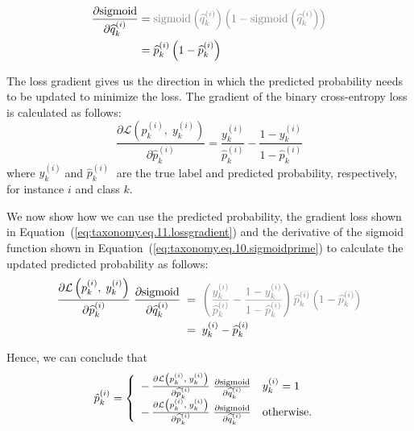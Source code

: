 \documentclass[final,1p,times,authoryear]{elsarticle}
\begin{document}
\begin{align}
    \label{eq:taxonomy.eq.10.sigmoidprime}
    \frac{\partial{\text{sigmoid}}}{\partial{\widehat{q}_k^{(i)}}}
    & = \textcolor{gray}{\text{sigmoid}\left(\widehat{q}_k^{(i)}\right)\left(1-\text{sigmoid}\left(\widehat{q}_k^{(i)}\right)\right)}
    \\
    & = \widehat{p}_k^{(i)}\left(1-\widehat{p}_k^{(i)}\right)
\end{align}

The loss gradient gives us the direction in which the predicted probability needs to be updated to minimize the loss. The gradient of the binary cross-entropy loss is calculated as follows:
\begin{equation}
    \label{eq:taxonomy.eq.11.lossgradient}
    \frac{\partial \mathcal{L} \left( \widehat{p}_k^{(i)},\;y_k^{(i)}\right)}{\partial \widehat{p}_k^{(i)} }=\frac{y_k^{(i)}}{\widehat{p}_k^{(i)}}-\frac{1-y_k^{(i)}}{1-\widehat{p}_k^{(i)}}
\end{equation}
where $y_k^{(i)}\; $and $\widehat{p}_k^{(i)}\; $ are the true label and predicted probability, respectively, for instance $i $ and class $k $.

We now show how we can use the predicted probability, the gradient loss shown in Equation~(\ref{eq:taxonomy.eq.11.lossgradient}) and the derivative of the sigmoid function shown in Equation~(\ref{eq:taxonomy.eq.10.sigmoidprime}) to calculate the updated predicted probability as follows:
\begin{align}
    \label{eq:taxonomy.eq.12.newpredelement}
    \frac{\partial \mathcal{L}\left(p_k^{(i)},\; y_k^{(i)}\right)}{\partial \widehat{p}_k^{(i)} }\; \frac{\partial{\text{sigmoid}}}{\partial{\widehat{q}_k^{(i)}}}
    & \; = \; \textcolor{gray}{\left(\frac{y_k^{(i)}}{\widehat{p}_k^{(i)}}-\frac{1-y_k^{(i)}}{1-\widehat{p}_k^{(i)}}\right)\widehat{p}_k^{(i)}\left(1-\widehat{p}_k^{(i)}\right) }
    \\
    & \; = \; y_k^{(i)}-\widehat{p}_k^{(i)}
\end{align}

Hence, we can conclude that
\begin{equation}
    \label{eq:taxonomy.eq.13.newpred}
    \begin{array}{@{}l}
    \hat{p}_{k}^{(i)} = \left\{
        \begin{array}{ll}
            -\, \frac{\partial \mathcal{L}\left(p_k^{(i)},\;y_k^{(i)}\right)}{\partial \widehat{p}_k^{(i)} }\;{ \frac{\partial{\text{sigmoid}}}{\partial{\widehat{q}_k^{(i)}}}}
            &
            y_k^{(i)}=1
            \\
            -\,\frac{\partial \mathcal{L}\left(p_k^{(i)},\;y_k^{(i)}\right)}{\partial \widehat{p}_k^{(i)} }\; {\frac{\partial{\text{sigmoid}}}{\partial{\widehat{q}_k^{(i)}}}}
            &
            \text{otherwise.}
        \end{array}\right.
    \end{array}
\end{equation}
\end{document}

